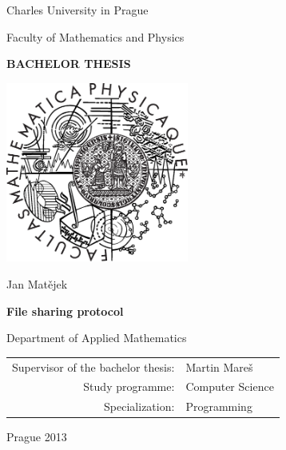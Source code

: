 \documentclass[12pt,a4paper]{report}
\begin{document}


\pagestyle{empty}
\begin{center}

\large

Charles University in Prague

\medskip

Faculty of Mathematics and Physics

\vfill

{\bf\Large BACHELOR THESIS}

\vfill

\centerline{\mbox{\includegraphics[width=60mm]{logo.eps}}}

\vfill
\vspace{5mm}

{\LARGE Jan Matějek}

\vspace{15mm}

{\LARGE\bfseries File sharing protocol}

\vfill

Department of Applied Mathematics

\vfill

\begin{tabular}{rl}

Supervisor of the bachelor thesis: & Martin Mareš \\
\noalign{\vspace{2mm}}
Study programme: & Computer Science \\
\noalign{\vspace{2mm}}
Specialization: & Programming \\
\end{tabular}

\vfill

Prague 2013

\end{center}
\end{document}
